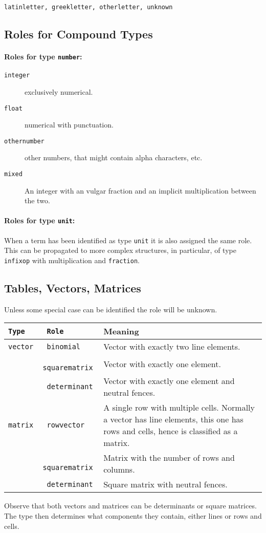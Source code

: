 \documentclass{article}
\begin{document}
\texttt{latinletter, greekletter, otherletter, unknown}





\subsection{Roles for Compound Types}

\paragraph{Roles for type \texttt{number}:}

\begin{description}
\item[\texttt{integer}] exclusively numerical.
\item[\texttt{float}] numerical with punctuation.
\item[\texttt{othernumber}] other numbers, that might contain alpha characters, etc.
\item[\texttt{mixed}] An integer with an vulgar fraction and an implicit multiplication between the two.
\end{description}

\paragraph{Roles for type \texttt{unit}: }

When a term has been identified as type \texttt{unit} it is also assigned the
same role. This can be propagated to more complex structures, in particular, of
type \texttt{infixop} with multiplication and \texttt{fraction}.


\subsection{Tables, Vectors, Matrices}

Unless some special case can be identified the role will be unknown.

\begin{tabular}{>{\tt}l>{\tt}lp{11cm}}
  Type & Role & Meaning\\\hline
  vector & binomial & Vector with exactly two line elements.\\
       & squarematrix & Vector with exactly one element.\\
       & determinant & Vector with exactly one element and neutral fences.\\
  matrix & rowvector & A single row with multiple cells. Normally a vector has line elements,
                       this one has rows and cells, hence is classified as a matrix.\\
       & squarematrix & Matrix with the number of rows and columns.\\
       & determinant & Square matrix with neutral fences.\\
\end{tabular}
Observe that both vectors and matrices can be determinants or square
matrices. The type then determines what components they contain, either lines or
rows and cells.
\end{document}
